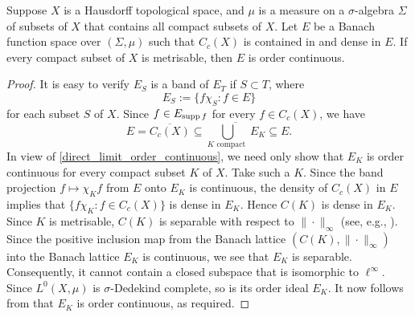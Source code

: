 
\begin{theorem}
	Suppose $X$ is a Hausdorff topological space, and  $\mu$ is a measure on a $\sigma$-algebra $\Sigma$ of subsets of $X$  that contains all compact subsets of $X$. Let $E$ be a Banach function space over $(\Sigma,\mu)$ such that $C_c(X)$ is contained in and dense in $E$. If every compact subset of $X$ is metrisable, then $E$ is order continuous.
\end{theorem}
\begin{proof}
	It is easy to verify $E_S$ is a band of $E_T$ if $S\subset T$, where \[E_S:=\{f\chi_S : f\in E\}\] for each subset $S$ of $X$.  
Since $f\in E_{\operatorname{supp} f}$ for every $f\in C_c(X)$, we have 
\[
E=\overline{C_c(X)}\subseteq \overline{\bigcup_{K \mbox{ compact }}E_K}\subseteq E.
\] 
In view of \cref{direct_limit_order_continuous}, we need only show that $E_K$ is order continuous for every compact subset $K$ of $X$. Take such a $K$. Since the band projection $f\mapsto \chi_K f$ from $E$ onto $E_K$ is continuous, the density of $C_c(X)$ in $E$ implies that $\{f\chi_K : f\in C_c(X)\}$ is dense in $E_K$. Hence $C(K)$ is dense in $E_K$. Since $K$ is metrisable, $C(K)$ is separable with respect to $\|\cdot\|_\infty$ (see, e.g., \cite[Theorem~26.15]{jameson_TOPOLOGY_AND_NORMED_SPACES:1974}). Since the positive inclusion map from the Banach lattice $(C(K), \|\cdot\|_\infty)$ into the Banach lattice $E_K$ is continuous, we see that $E_K$ is separable. Consequently, it cannot contain a closed subspace that is isomorphic to $\ell^\infty$. Since $L^0(X,\mu)$ is  $\sigma$-Dedekind complete, so is its order ideal $E_K$. It now follows from \cite[Corollary~2.4.3]{meyer-nieberg_BANACH_LATTICES:1991} that $E_K$  is order continuous, as required.
\end{proof}


